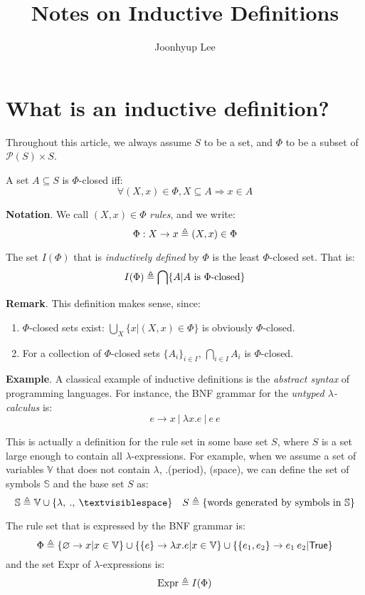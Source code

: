 \documentclass[12pt]{article}
\title{Notes on Inductive Definitions}
\author{Joonhyup Lee}
\date{}
\begin{document}
\maketitle
\section{What is an inductive definition?}\label{sec:inddef}
Throughout this article, we always assume $S$ to be a set, and $\Phi$ to be a subset of $\mathcal{P}(S)\times S$.
\begin{definition}
	A set $A\subseteq S$ is $\Phi$-closed iff:
	\[\forall(X,x)\in\Phi,X\subseteq A\Rightarrow x\in A\]
\end{definition}

\noindent\textbf{Notation}. We call $(X,x)\in\Phi$ \emph{rules}, and we write:
\[\Phi:X\rightarrow x\triangleq(X,x)\in\Phi\]

\begin{definition}
	The set $I(\Phi)$ that is \emph{inductively defined} by $\Phi$ is the least $\Phi$-closed set.
	That is:
	\[I(\Phi)\triangleq\bigcap\{A|A\text{ is }\Phi\text{-closed}\}\]
\end{definition}

\noindent\textbf{Remark}. This definition makes sense, since:
\begin{enumerate}
	\item $\Phi$-closed sets exist: $\bigcup_X\{x|(X,x)\in\Phi\}$ is obviously $\Phi$-closed.
	\item For a collection of $\Phi$-closed sets $\{A_i\}_{i\in I}$, $\bigcap_{i\in I}A_i$ is $\Phi$-closed.
\end{enumerate}

\noindent\textbf{Example}. A classical example of inductive definitions is the \emph{abstract syntax} of programming languages.
For instance, the BNF grammar for the \emph{untyped $\lambda$-calculus} is:
\[e\rightarrow x\:|\:\lambda x.e\:|\:e\:e\]

This is actually a definition for the rule set in some base set $S$, where $S$ is a set large enough to contain all $\lambda$-expressions.
For example, when we assume a set of variables $\mathbb{V}$ that does not contain $\lambda$, .(period), \textvisiblespace(space),
we can define the set of symbols $\mathbb{S}$ and the base set $S$ as:
\[\mathbb{S}\defeq\mathbb{V}\cup\{\lambda,\:.,\:\textvisiblespace\}\quad S\defeq\{\text{words generated by symbols in }\mathbb{S}\}\]

The rule set that is expressed by the BNF grammar is:
\[
	\Phi\triangleq\{\varnothing\rightarrow x|x\in\mathbb{V}\}
	\cup\{\{e\}\rightarrow\lambda x.e|x\in\mathbb{V}\}
	\cup\{\{e_1,e_2\}\rightarrow e_1\:e_2|\textsf{True}\}
\]
and the set Expr of $\lambda$-expressions is:
\[\text{Expr}\triangleq I(\Phi)\]
\end{document}
